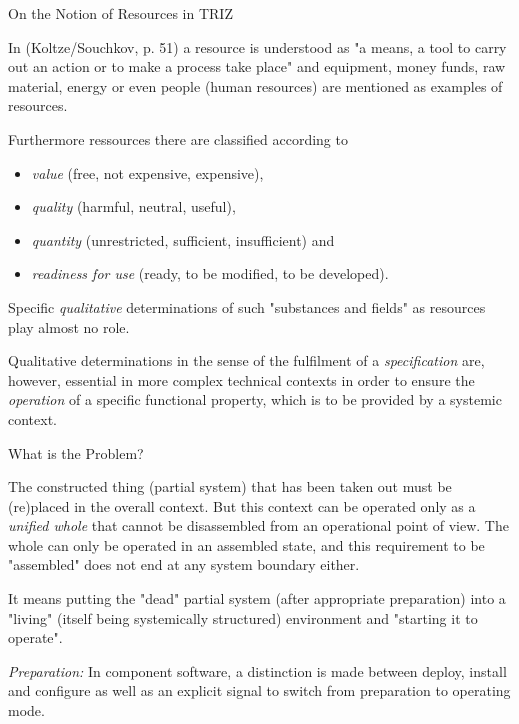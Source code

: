\documentclass{beamer}
\begin{document}
\begin{frame}{On the Notion of Resources in TRIZ}\small

In (Koltze/Souchkov, p. 51) a resource is understood as "a means, a tool to
carry out an action or to make a process take place" and equipment, money
funds, raw material, energy or even people (human resources) are mentioned as
examples of resources.\vspace*{-.5em}

Furthermore ressources there are classified according to\vspace*{-1em}
\begin{itemize}
\item \emph{value} (free, not expensive, expensive),
\item \emph{quality} (harmful, neutral, useful),
\item \emph{quantity} (unrestricted, sufficient, insufficient) and
\item \emph{readiness for use} (ready, to be modified, to be developed).
\end{itemize}\vspace*{-1em}

Specific \emph{qualitative} determinations of such "substances and fields" as
resources play almost no role.\vspace*{-.5em}

Qualitative determinations in the sense of the fulfilment of a
\emph{specification} are, however, essential in more complex technical
contexts in order to ensure the \emph{operation} of a specific functional
property, which is to be provided by a systemic context.

\end{frame}

\begin{frame}{What is the Problem?} 

The constructed thing (partial system) that has been taken out must be
(re)placed in the overall context.  But this context can be operated only as a
\emph{unified whole} that cannot be disassembled from an operational point of
view. The whole can only be operated in an assembled state, and this
requirement to be "assembled" does not end at any system boundary either.

It means putting the "dead" partial system (after appropriate preparation)
into a "living" (itself being systemically structured) environment and
"starting it to operate".

\emph{Preparation:} In component software, a distinction is made between
deploy, install and configure as well as an explicit signal to switch from
preparation to operating mode.

\end{frame}
\end{document}
